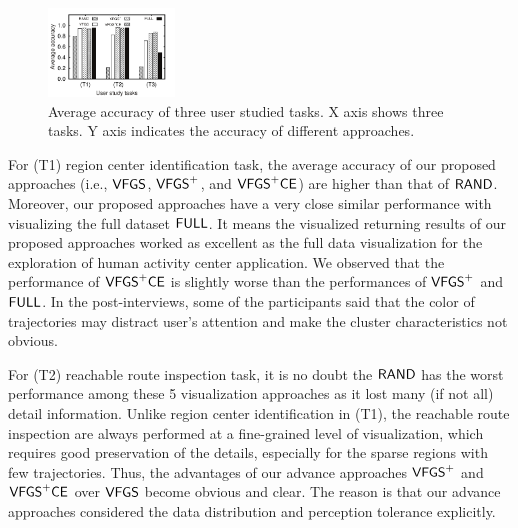 \begin{figure}[t]
	\centering
	\includegraphics[width=0.3\textwidth]{pictures/userstudy}
	\vspace{-4mm}
	\caption{Average accuracy of three user studied tasks. X axis shows three tasks. Y axis indicates the accuracy of different approaches.}
	\label{fig:accuracy}
	\vspace{-6mm}
\end{figure}

For (T1) region center identification task, the average accuracy of our proposed approaches (i.e., $\mathsf{VFGS}$, $\mathsf{VFGS}^{+}$, and $\mathsf{VFGS}^{+}\mathsf{CE}$) are higher than that of $\mathsf{RAND}{}$.
Moreover, our proposed approaches have a very close similar performance with visualizing the full dataset $\mathsf{FULL}$.
It means the visualized returning results of our proposed approaches worked as excellent as the full data visualization for the exploration of human activity center application.
We observed that the performance of $\mathsf{VFGS}^{+}\mathsf{CE}$ is slightly worse than the performances of $\mathsf{VFGS}^{+}$ and $\mathsf{FULL}$.
In the post-interviews, some of the participants said that the color of trajectories may distract user's attention and make the cluster characteristics not obvious.



For (T2) reachable route inspection task, it is no doubt the $\mathsf{RAND}$ has the worst performance among these 5 visualization approaches as it lost many (if not all) detail information.
Unlike region center identification in (T1), the reachable route inspection are always performed at a fine-grained level of visualization,
which requires good preservation of the details, especially for the sparse regions with few trajectories.
Thus, the advantages of our advance approaches $\mathsf{VFGS}^{+}$ and $\mathsf{VFGS}^{+}\mathsf{CE}$ over $\mathsf{VFGS}$ become obvious and clear.
The reason is that our advance approaches considered the data distribution and perception tolerance explicitly.

